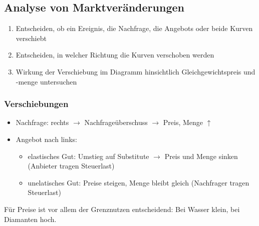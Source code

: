 \subsection{Analyse von Marktveränderungen}
\begin{enumerate}\itemsep0em
	\item Entscheiden, ob ein Ereignis, die Nachfrage, die Angebots oder beide Kurven verschiebt
	\item Entscheiden, in welcher Richtung die Kurven verschoben werden
	\item Wirkung der Verschiebung im Diagramm hinsichtlich Gleichgewichtspreis und -menge untersuchen 
\end{enumerate}

\subsubsection{Verschiebungen}
\begin{itemize}\itemsep0em
	\item Nachfrage: rechts $\rightarrow$ Nachfrageüberschuss $\rightarrow$ Preis, Menge $\uparrow$
	\item Angebot nach links:
	\begin{itemize}
		\item elastisches Gut: Umstieg auf Substitute $\rightarrow$ Preis und Menge sinken (Anbieter tragen Steuerlast)
		\item unelatisches Gut: Preise steigen, Menge bleibt gleich (Nachfrager tragen Steuerlast)
	\end{itemize}
\end{itemize}

Für Preise ist vor allem der Grenznutzen entscheidend: Bei Wasser klein, bei Diamanten hoch.